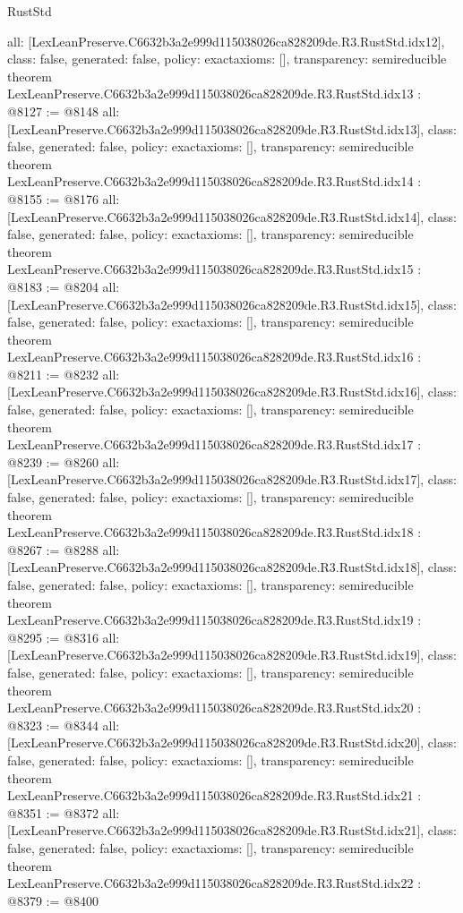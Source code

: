 \begin{lexlean}{RustStd}
\begin{coremodule}
{  all: [LexLeanPreserve.C6632b3a2e999d115038026ca828209de.R3.RustStd.idx12],
  class: false,
  generated: false,
  policy: exact{axioms: []},
  transparency: semireducible
}
theorem LexLeanPreserve.C6632b3a2e999d115038026ca828209de.R3.RustStd.idx13 : @8127 := @8148 {
  all: [LexLeanPreserve.C6632b3a2e999d115038026ca828209de.R3.RustStd.idx13],
  class: false,
  generated: false,
  policy: exact{axioms: []},
  transparency: semireducible
}
theorem LexLeanPreserve.C6632b3a2e999d115038026ca828209de.R3.RustStd.idx14 : @8155 := @8176 {
  all: [LexLeanPreserve.C6632b3a2e999d115038026ca828209de.R3.RustStd.idx14],
  class: false,
  generated: false,
  policy: exact{axioms: []},
  transparency: semireducible
}
theorem LexLeanPreserve.C6632b3a2e999d115038026ca828209de.R3.RustStd.idx15 : @8183 := @8204 {
  all: [LexLeanPreserve.C6632b3a2e999d115038026ca828209de.R3.RustStd.idx15],
  class: false,
  generated: false,
  policy: exact{axioms: []},
  transparency: semireducible
}
theorem LexLeanPreserve.C6632b3a2e999d115038026ca828209de.R3.RustStd.idx16 : @8211 := @8232 {
  all: [LexLeanPreserve.C6632b3a2e999d115038026ca828209de.R3.RustStd.idx16],
  class: false,
  generated: false,
  policy: exact{axioms: []},
  transparency: semireducible
}
theorem LexLeanPreserve.C6632b3a2e999d115038026ca828209de.R3.RustStd.idx17 : @8239 := @8260 {
  all: [LexLeanPreserve.C6632b3a2e999d115038026ca828209de.R3.RustStd.idx17],
  class: false,
  generated: false,
  policy: exact{axioms: []},
  transparency: semireducible
}
theorem LexLeanPreserve.C6632b3a2e999d115038026ca828209de.R3.RustStd.idx18 : @8267 := @8288 {
  all: [LexLeanPreserve.C6632b3a2e999d115038026ca828209de.R3.RustStd.idx18],
  class: false,
  generated: false,
  policy: exact{axioms: []},
  transparency: semireducible
}
theorem LexLeanPreserve.C6632b3a2e999d115038026ca828209de.R3.RustStd.idx19 : @8295 := @8316 {
  all: [LexLeanPreserve.C6632b3a2e999d115038026ca828209de.R3.RustStd.idx19],
  class: false,
  generated: false,
  policy: exact{axioms: []},
  transparency: semireducible
}
theorem LexLeanPreserve.C6632b3a2e999d115038026ca828209de.R3.RustStd.idx20 : @8323 := @8344 {
  all: [LexLeanPreserve.C6632b3a2e999d115038026ca828209de.R3.RustStd.idx20],
  class: false,
  generated: false,
  policy: exact{axioms: []},
  transparency: semireducible
}
theorem LexLeanPreserve.C6632b3a2e999d115038026ca828209de.R3.RustStd.idx21 : @8351 := @8372 {
  all: [LexLeanPreserve.C6632b3a2e999d115038026ca828209de.R3.RustStd.idx21],
  class: false,
  generated: false,
  policy: exact{axioms: []},
  transparency: semireducible
}
theorem LexLeanPreserve.C6632b3a2e999d115038026ca828209de.R3.RustStd.idx22 : @8379 := @8400 {
}
\end{coremodule}
\end{lexlean}
